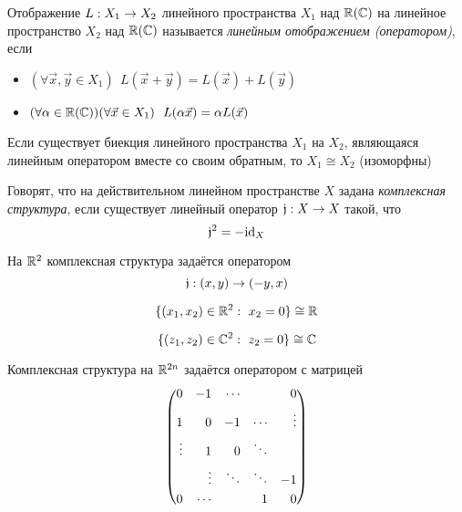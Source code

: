 \begin{definition}
	Отображение $L: X_1 \rightarrow X_2$ линейного пространства $X_1$ над
	$\mathbb{R}(\mathbb{C})$ на линейное пространство $X_2$ над
	$\mathbb{R}(\mathbb{C})$ называется
	\textit{линейным отображением (оператором)}, если
	\begin{itemize}
		\item $(\forall \vec{x}, \vec{y} \in X_1)\ \ 
			L(\vec{x} + \vec{y}) = L(\vec{x}) + L(\vec{y})$
		
		\item $(\forall \alpha \in \mathbb{R}(\mathbb{C}))(\forall \vec{x}
			\in X_1)\ \ L(\alpha \vec{x}) = \alpha L(\vec{x})$
	\end{itemize}
\end{definition}

\begin{definition}
	Если существует биекция линейного пространства
	$X_1$ на $X_2$, являющаяся линейным оператором
	вместе со своим обратным, то $X_1 \cong X_2$ (изоморфны)
\end{definition}

\begin{definition}
	Говорят, что на действительном линейном пространстве
	$X$ задана \textit{комплексная структура}, если
	существует линейный оператор $\mathfrak{j}: X \to X$
	такой, что
	\[
		\mathfrak{j}^2  = -\mathrm{id}_X
	\]
\end{definition}

\begin{example}
	На $\mathbb{R}^2$ комплексная структура задаётся оператором
	\[
		\mathfrak{j}: (x, y) \rightarrow (-y, x)
	\]
\end{example}

\begin{example}
	\[
		\{(x_1, x_2) \in \mathbb{R}^2 :\  x_2 = 0\} \cong \mathbb{R}
	\]
\end{example}

\begin{example}
	\[
		\{(z_1, z_2) \in \mathbb{C}^2 :\  z_2 = 0\} \cong \mathbb{C}
	\]
\end{example}

\begin{lemma}
	Комплексная структура на $\mathbb{R}^{2n}$ задаётся оператором с матрицей
	\[
		\left(\begin{aligned}
		0& & -1& & \cdots& & & & 0 \\
		1& & 0& & -1& & \cdots& & \vdots \\
		\vdots& & 1& & 0& & \ddots& & \\
		& & \vdots& & \ddots& & \ddots& & -1 \\
		0& & \cdots& & & & 1& & 0
		\end{aligned}\right)
	\]
\end{lemma}


